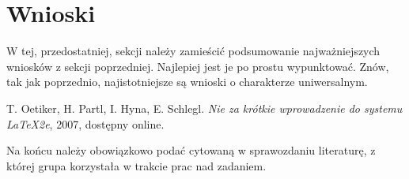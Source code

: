 \documentclass{classrep}
\begin{document}
\section{Wnioski}
{\color{blue}
W tej, przedostatniej, sekcji należy zamieścić podsumowanie najważniejszych
wniosków z sekcji poprzedniej. Najlepiej jest je po prostu wypunktować. Znów,
tak jak poprzednio, najistotniejsze są wnioski o charakterze uniwersalnym.}

\begin{thebibliography}{0}
   T. Oetiker, H. Partl, I. Hyna, E. Schlegl.
    \textsl{Nie za krótkie wprowadzenie do systemu \LaTeX2e}, 2007, dostępny
    online.
\end{thebibliography}

{\color{blue}
Na końcu należy obowiązkowo podać cytowaną w sprawozdaniu literaturę, z której
grupa korzystała w trakcie prac nad zadaniem.}
\end{document}
